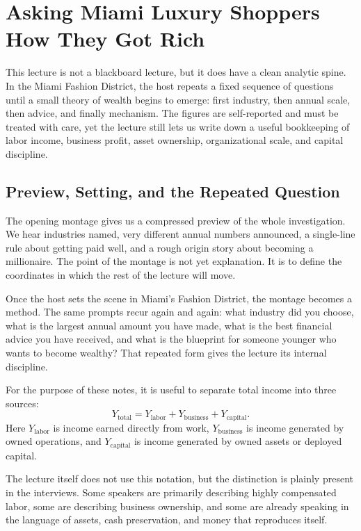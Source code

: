 \chapter{Asking Miami Luxury Shoppers How They Got Rich}

This lecture is not a blackboard lecture, but it does have a clean analytic spine. In the Miami Fashion District, the host repeats a fixed sequence of questions until a small theory of wealth begins to emerge: first industry, then annual scale, then advice, and finally mechanism. The figures are self-reported and must be treated with care, yet the lecture still lets us write down a useful bookkeeping of labor income, business profit, asset ownership, organizational scale, and capital discipline.

\section{Preview, Setting, and the Repeated Question}

The opening montage gives us a compressed preview of the whole investigation. We hear industries named, very different annual numbers announced, a single-line rule about getting paid well, and a rough origin story about becoming a millionaire. The point of the montage is not yet explanation. It is to define the coordinates in which the rest of the lecture will move.

Once the host sets the scene in Miami's Fashion District, the montage becomes a method. The same prompts recur again and again: what industry did you choose, what is the largest annual amount you have made, what is the best financial advice you have received, and what is the blueprint for someone younger who wants to become wealthy? That repeated form gives the lecture its internal discipline.

\begin{definition}
For the purpose of these notes, it is useful to separate total income into three sources:
\begin{equation}
Y_{\mathrm{total}} = Y_{\mathrm{labor}} + Y_{\mathrm{business}} + Y_{\mathrm{capital}}.
\end{equation}
Here \(Y_{\mathrm{labor}}\) is income earned directly from work, \(Y_{\mathrm{business}}\) is income generated by owned operations, and \(Y_{\mathrm{capital}}\) is income generated by owned assets or deployed capital.
\end{definition}

The lecture itself does not use this notation, but the distinction is plainly present in the interviews. Some speakers are primarily describing highly compensated labor, some are describing business ownership, and some are already speaking in the language of assets, cash preservation, and money that reproduces itself.

